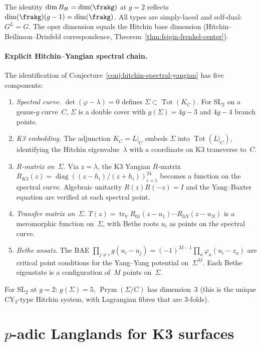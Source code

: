 \noindent The identity $\dim B_H = \dim(\frakg)$ at $g = 2$ reflects $\dim(\frakg)(g-1) = \dim(\frakg)$. All types are simply-laced and self-dual: $G^L = G$. The oper dimension equals the Hitchin base dimension (Hitchin--Beilinson--Drinfeld correspondence, Theorem~\ref{thm:feigin-frenkel-center}).

\paragraph{Explicit Hitchin--Yangian spectral chain.}
The identification of Conjecture~\ref{conj:hitchin-spectral-yangian} has five components:
\begin{enumerate}[label=\textup{(\arabic*)}]
 \item \emph{Spectral curve.} $\det(\varphi - \lambda) = 0$ defines $\Sigma \subset \operatorname{Tot}(K_C)$. For $\mathrm{SL}_2$ on a genus-$g$ curve~$C$, $\Sigma$ is a double cover with $g(\Sigma) = 4g - 3$ and $4g - 4$ branch points.
 \item \emph{K3 embedding.} The adjunction $K_C = L|_C$ embeds $\Sigma$ into $\operatorname{Tot}(L|_C)$, identifying the Hitchin eigenvalue~$\lambda$ with a coordinate on K3 transverse to~$C$.
 \item \emph{$R$-matrix on~$\Sigma$.} Via $z = \lambda$, the K3 Yangian $R$-matrix $R_{K3}(z) = \operatorname{diag}((z - h_i)/(z + h_i))_{i=1}^{24}$ becomes a function on the spectral curve. Algebraic unitarity $R(z)R(-z) = I$ and the Yang--Baxter equation are verified at each spectral point.
 \item \emph{Transfer matrix on~$\Sigma$.} $T(z) = \operatorname{tr}_V R_{01}(z - u_1) \cdots R_{0N}(z - u_N)$ is a meromorphic function on~$\Sigma$, with Bethe roots $u_i$ as points on the spectral curve.
 \item \emph{Bethe ansatz.} The BAE $\prod_{j \neq i} g(u_i - u_j) = (-1)^{M-1} \prod_a \varphi_a(u_i - z_a)$ are critical point conditions for the Yang--Yang potential on~$\Sigma^M$. Each Bethe eigenstate is a configuration of~$M$ points on~$\Sigma$.
\end{enumerate}
\noindent For $\mathrm{SL}_2$ at $g = 2$: $g(\Sigma) = 5$, $\operatorname{Prym}(\Sigma/C)$ has dimension~$3$ (this is the unique CY$_3$-type Hitchin system, with Lagrangian fibres that are $3$-folds).


\section{\texorpdfstring{$p$}{p}-adic Langlands for K3 surfaces}
\label{sec:padic-langlands-k3}

